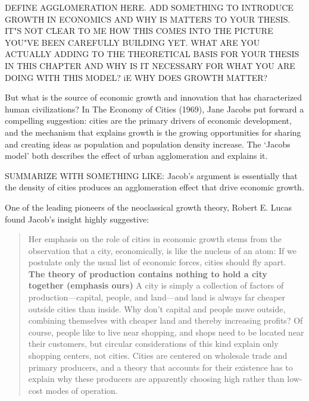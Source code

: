 DEFINE AGGLOMERATION HERE. 
ADD SOMETHING TO INTRODUCE  GROWTH IN ECONOMICS AND WHY IS MATTERS TO YOUR THESIS. IT"S NOT CLEAR TO ME HOW THIS COMES INTO THE PICTURE YOU"VE BEEN CAREFULLY BUILDING YET. WHAT ARE YOU ACTUALLY ADDING TO THE THEORETICAL BASIS FOR YOUR THESIS IN THIS CHAPTER AND WHY IS IT NECESSARY FOR WHAT YOU ARE DOING WITH THIS MODEL? iE WHY DOES GROWTH MATTER? 


But what is the source of economic growth and innovation that has characterized human civilizations? In The Economy of Cities (1969), Jane Jacobs \cite{jacobsEconomyCities1969} put forward a compelling suggestion: %
cities are the primary drivers of economic development, and  the mechanism that explains growth is  the growing opportunities for sharing and creating ideas as population and population density increase. The `Jacobs model'  both describes the effect of urban agglomeration and explains it.

 SUMMARIZE WITH SOMETHING LIKE:  Jacob's argument is  essentially that the density of cities produces an agglomeration effect that drive economic growth.  

One of the leading pioneers of the neoclassical growth theory, Robert E. Lucas \cite{lucasMechanicsEconomicDevelopment1988} found Jacob's insight highly suggestive:

\begin{quotation}
    \noindent Her emphasis on the role of cities in economic growth stems from the observation that a city, economically, is like the nucleus of an atom: If we postulate only the usual list of economic forces, cities should fly apart. \textbf{The theory of production contains nothing to hold a city together (emphasis ours)} A city is simply a collection of factors of production---capital, people, and land---and land is always far cheaper outside cities than inside. Why don't capital and people move outside, combining themselves with cheaper land and thereby increasing profits? Of course, people like to live near shopping, and shops need to be located near their customers, but circular considerations of this kind explain only shopping centers, not cities. Cities are centered on wholesale trade and primary producers, and a theory that accounts for their existence has to explain why these producers are apparently choosing high rather than low-cost modes of operation.
\end{quotation}


